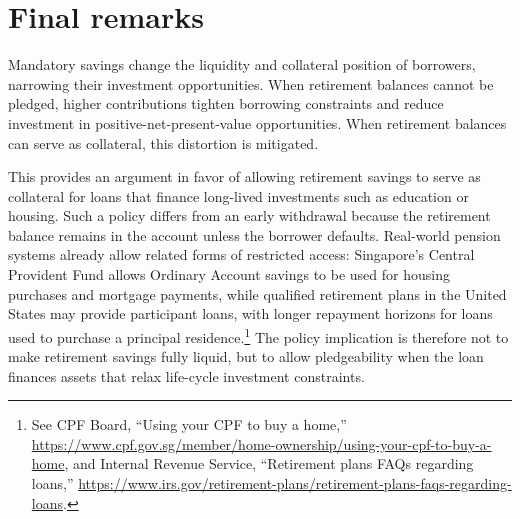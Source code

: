 \documentclass[draft,pdftex,nolinenumbers,noinfoline]{article}
\theoremstyle{plain}
\begin{document}
\section{Final remarks}

Mandatory savings change the liquidity and collateral position of borrowers, narrowing their investment opportunities. When retirement balances cannot be pledged, higher contributions tighten borrowing constraints and reduce investment in positive-net-present-value opportunities. When retirement balances can serve as collateral, this distortion is mitigated.

This provides an argument in favor of allowing retirement savings to serve as collateral for loans that finance long-lived investments such as education or housing. Such a policy differs from an early withdrawal because the retirement balance remains in the account unless the borrower defaults. Real-world pension systems already allow related forms of restricted access: Singapore's Central Provident Fund allows Ordinary Account savings to be used for housing purchases and mortgage payments, while qualified retirement plans in the United States may provide participant loans, with longer repayment horizons for loans used to purchase a principal residence.\footnote{See CPF Board, ``Using your CPF to buy a home,'' \url{https://www.cpf.gov.sg/member/home-ownership/using-your-cpf-to-buy-a-home}, and Internal Revenue Service, ``Retirement plans FAQs regarding loans,'' \url{https://www.irs.gov/retirement-plans/retirement-plans-faqs-regarding-loans}.} The policy implication is therefore not to make retirement savings fully liquid, but to allow pledgeability when the loan finances assets that relax life-cycle investment constraints.



\end{document}
